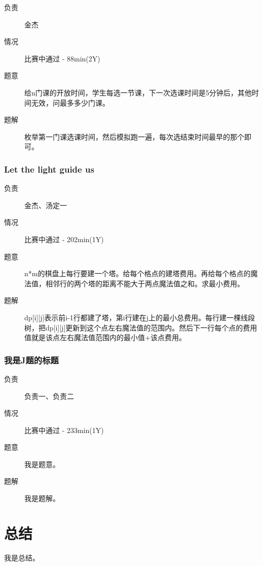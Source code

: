 \documentclass[a4paper, 11pt, nofonts, nocap, fancyhdr]{ctexart}
\newcommand{\problem}[1]{\subsubsection{#1}}
\begin{document}
\begin{description}
\item[负责] 金杰
\item[情况] 比赛中通过 - 88min(2Y)
\item[题意]
给n门课的开放时间，学生每选一节课，下一次选课时间是5分钟后，其他时间无效，问最多多少门课。
\item[题解]
枚举第一门课选课时间，然后模拟跑一遍，每次选结束时间最早的那个即可。
\end{description}

\problem{Let the light guide us}

\begin{description}
\item[负责] 金杰、汤定一
\item[情况] 比赛中通过 - 202min(1Y)
\item[题意]
n*m的棋盘上每行要建一个塔。给每个格点的建塔费用。再给每个格点的魔法值，相邻行的两个塔的距离不能大于两点魔法值之和。求最小费用。
\item[题解]
dp[i][j]表示前i-1行都建了塔，第i行建在j上的最小总费用。每行建一棵线段树，把dp[i][j]更新到这个点左右魔法值的范围内。然后下一行每个点的费用值就是该点左右魔法值范围内的最小值+该点费用。
\end{description}

\problem{我是J题的标题}

\begin{description}
\item[负责] 负责一、负责二
\item[情况] 比赛中通过 - 233min(1Y)
\item[题意]
我是题意。
\item[题解]
我是题解。
\end{description}

\section{总结}

我是总结。
\end{document}
